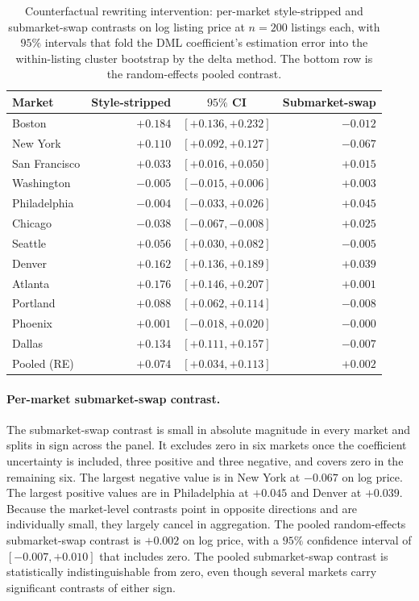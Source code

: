 \begin{table}[H]
\centering
\caption{Counterfactual rewriting intervention: per-market style-stripped and
submarket-swap contrasts on log listing price at $n=200$ listings each, with $95\%$
intervals that fold the DML coefficient's estimation error into the within-listing
cluster bootstrap by the delta method. The bottom row is the random-effects pooled
contrast.}
\label{tab:counterfactual-12}
\small
\begin{tabular}{lrcr}
\toprule
Market & Style-stripped & $95\%$ CI & Submarket-swap \\
\midrule
Boston        & $+0.184$ & $[+0.136, +0.232]$ & $-0.012$ \\
New York      & $+0.110$ & $[+0.092, +0.127]$ & $-0.067$ \\
San Francisco & $+0.033$ & $[+0.016, +0.050]$ & $+0.015$ \\
Washington    & $-0.005$ & $[-0.015, +0.006]$ & $+0.003$ \\
Philadelphia  & $-0.004$ & $[-0.033, +0.026]$ & $+0.045$ \\
Chicago       & $-0.038$ & $[-0.067, -0.008]$ & $+0.025$ \\
Seattle       & $+0.056$ & $[+0.030, +0.082]$ & $-0.005$ \\
Denver        & $+0.162$ & $[+0.136, +0.189]$ & $+0.039$ \\
Atlanta       & $+0.176$ & $[+0.146, +0.207]$ & $+0.001$ \\
Portland      & $+0.088$ & $[+0.062, +0.114]$ & $-0.008$ \\
Phoenix       & $+0.001$ & $[-0.018, +0.020]$ & $-0.000$ \\
Dallas        & $+0.134$ & $[+0.111, +0.157]$ & $-0.007$ \\
\midrule
Pooled (RE)   & $+0.074$ & $[+0.034, +0.113]$ & $+0.002$ \\
\bottomrule
\end{tabular}
\end{table}

\paragraph{Per-market submarket-swap contrast.} The submarket-swap contrast is
small in absolute magnitude in every market and splits in sign across the panel.
It excludes zero in six markets once the coefficient uncertainty is included,
three positive and three negative, and covers zero in the remaining six. The largest negative value is in New York at $-0.067$ on log price. The largest positive values are in Philadelphia at $+0.045$ and Denver at $+0.039$. Because the market-level contrasts point in opposite directions and are individually small, they largely cancel in aggregation. The pooled random-effects submarket-swap contrast is $+0.002$ on log price, with a $95\%$ confidence interval of $[-0.007, +0.010]$ that includes zero. The pooled submarket-swap contrast is statistically indistinguishable from zero, even though several markets carry significant contrasts of either sign.

